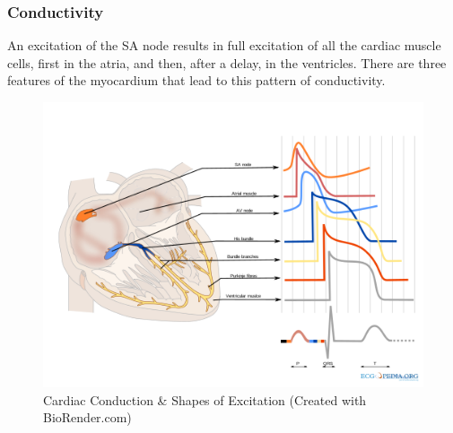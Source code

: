 \subsubsection{Conductivity} 

An excitation of the SA node results in full excitation of all the cardiac muscle cells, first in the atria, and then, after a delay, in the ventricles. There are three features of the myocardium that lead to this pattern of conductivity. 

\begin{figure}[!h]
    \centering
    \includegraphics[width=1\linewidth]{./figure/Cardiac_Conduction.png}
    \caption{Cardiac Conduction \& Shapes of Excitation \footnotesize{(Created with BioRender.com)}}
    \label{fig:Cardiac_Conduction}
\end{figure}

